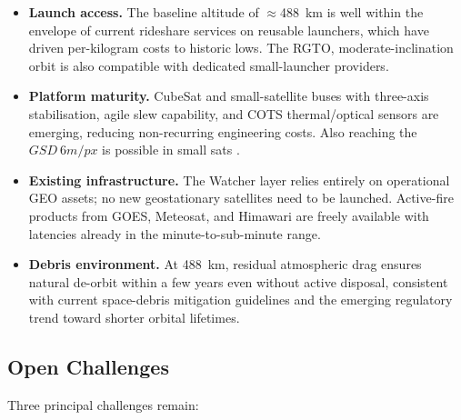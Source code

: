 \begin{itemize}
    \item \textbf{Launch access.} The baseline altitude of $\approx$488~km is well within the envelope of current rideshare services on reusable launchers, which have driven per-kilogram costs to historic lows. The RGTO, moderate-inclination orbit is also compatible with dedicated small-launcher providers.
    \item \textbf{Platform maturity.} CubeSat and small-satellite buses with three-axis stabilisation, agile slew capability, and COTS thermal/optical sensors are emerging, reducing non-recurring engineering costs. Also reaching the $GSD~6m/px$ is possible in small sats .
    \item \textbf{Existing infrastructure.} The Watcher layer relies entirely on operational GEO assets; no new geostationary satellites need to be launched. Active-fire products from GOES, Meteosat, and Himawari are freely available with latencies already in the minute-to-sub-minute range.
    \item \textbf{Debris environment.} At 488~km, residual atmospheric drag ensures natural de-orbit within a few years even without active disposal, consistent with current space-debris mitigation guidelines and the emerging regulatory trend toward shorter orbital lifetimes.
\end{itemize}

\subsection{Open Challenges}

Three principal challenges remain:


